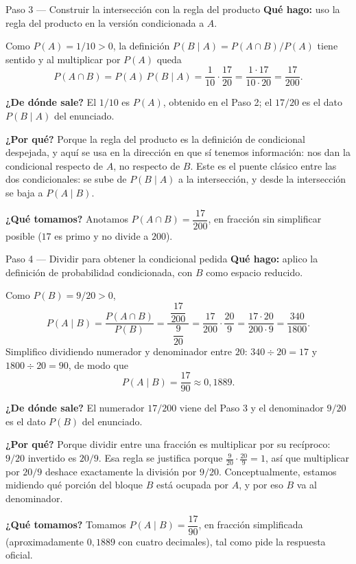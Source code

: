 \documentclass[11pt]{article}
\begin{document}
\begin{paso}{Paso 3 --- Construir la intersección con la regla del producto}
\textbf{Qué hago:} uso la regla del producto en la versión condicionada a $A$.

Como $P(A)=1/10>0$, la definición $P(B\mid A)=P(A\cap B)/P(A)$ tiene sentido y al multiplicar por $P(A)$ queda
\[
P(A\cap B)=P(A)\,P(B\mid A)=\frac{1}{10}\cdot\frac{17}{20}=\frac{1\cdot 17}{10\cdot 20}=\frac{17}{200}.
\]

\textbf{¿De dónde sale?} El $1/10$ es $P(A)$, obtenido en el Paso 2; el $17/20$ es el dato $P(B\mid A)$ del enunciado.

\textbf{¿Por qué?} Porque la regla del producto es la definición de condicional despejada, y aquí se usa en la dirección en que sí tenemos información: nos dan la condicional respecto de $A$, no respecto de $B$. Este es el puente clásico entre las dos condicionales: se sube de $P(B\mid A)$ a la intersección, y desde la intersección se baja a $P(A\mid B)$.

\textbf{¿Qué tomamos?} Anotamos $P(A\cap B)=\dfrac{17}{200}$, en fracción sin simplificar posible ($17$ es primo y no divide a $200$).
\end{paso}

\begin{paso}{Paso 4 --- Dividir para obtener la condicional pedida}
\textbf{Qué hago:} aplico la definición de probabilidad condicionada, con $B$ como espacio reducido.

Como $P(B)=9/20>0$,
\[
P(A\mid B)=\frac{P(A\cap B)}{P(B)}=\frac{\;\dfrac{17}{200}\;}{\;\dfrac{9}{20}\;}
=\frac{17}{200}\cdot\frac{20}{9}
=\frac{17\cdot 20}{200\cdot 9}
=\frac{340}{1800}.
\]
Simplifico dividiendo numerador y denominador entre $20$: $340\div 20=17$ y $1800\div 20=90$, de modo que
\[
P(A\mid B)=\frac{17}{90}\approx 0{,}1889.
\]

\textbf{¿De dónde sale?} El numerador $17/200$ viene del Paso 3 y el denominador $9/20$ es el dato $P(B)$ del enunciado.

\textbf{¿Por qué?} Porque dividir entre una fracción es multiplicar por su recíproco: $9/20$ invertido es $20/9$. Esa regla se justifica porque $\frac{9}{20}\cdot\frac{20}{9}=1$, así que multiplicar por $20/9$ deshace exactamente la división por $9/20$. Conceptualmente, estamos midiendo qué porción del bloque $B$ está ocupada por $A$, y por eso $B$ va al denominador.

\textbf{¿Qué tomamos?} Tomamos $P(A\mid B)=\dfrac{17}{90}$, en fracción simplificada (aproximadamente $0{,}1889$ con cuatro decimales), tal como pide la respuesta oficial.
\end{paso}
\end{document}
